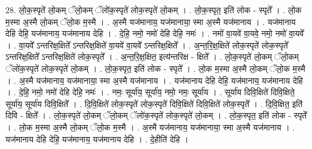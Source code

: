 \documentclass[17pt]{extarticle}
\begin{document}
28. लो॒क॒स्पृते॑ लो॒कम् ॅलो॒कम् ॅलो॑क॒स्पृते॑ लोक॒स्पृते॑ लो॒कम् । . लो॒क॒स्पृत॒ इति॑ लोक - स्पृते᳚ । . लो॒क म॒स्मा अ॒स्मै लो॒कम् ॅलो॒क म॒स्मै । . अ॒स्मै यज॑मानाय॒ यज॑मानाया॒ स्मा अ॒स्मै यज॑मानाय । . यज॑मानाय देहि देहि॒ यज॑मानाय॒ यज॑मानाय देहि । . दे॒हि॒ नमो॒ नमो॑ देहि देहि॒ नमः॑ । . नमो॑ वा॒यवे॑ वा॒यवे॒ नमो॒ नमो॑ वा॒यवे᳚ । . वा॒यवे᳚ ऽन्तरिक्ष॒क्षिते᳚ ऽन्तरिक्ष॒क्षिते॑ वा॒यवे॑ वा॒यवे᳚ ऽन्तरिक्ष॒क्षिते᳚ । . अ॒न्त॒रि॒क्ष॒क्षिते॑ लोक॒स्पृते॑ लोक॒स्पृते᳚ ऽन्तरिक्ष॒क्षिते᳚ ऽन्तरिक्ष॒क्षिते॑ लोक॒स्पृते᳚ । . अ॒न्त॒रि॒क्ष॒क्षित॒ इत्य॑न्तरिक्ष - क्षिते᳚ । . लो॒क॒स्पृते॑ लो॒कम् ॅलो॒कम् ॅलो॑क॒स्पृते॑ लोक॒स्पृते॑ लो॒कम् । . लो॒क॒स्पृत॒ इति॑ लोक - स्पृते᳚ । . लो॒क म॒स्मा अ॒स्मै लो॒कम् ॅलो॒क म॒स्मै । . अ॒स्मै यज॑मानाय॒ यज॑मानाया॒ स्मा अ॒स्मै यज॑मानाय । . यज॑मानाय देहि देहि॒ यज॑मानाय॒ यज॑मानाय देहि । . दे॒हि॒ नमो॒ नमो॑ देहि देहि॒ नमः॑ । . नमः॒ सूर्या॑य॒ सूर्या॑य॒ नमो॒ नमः॒ सूर्या॑य । . सूर्या॑य दिवि॒क्षिते॑ दिवि॒क्षिते॒ सूर्या॑य॒ सूर्या॑य दिवि॒क्षिते᳚ । . दि॒वि॒क्षिते॑ लोक॒स्पृते॑ लोक॒स्पृते॑ दिवि॒क्षिते॑ दिवि॒क्षिते॑ लोक॒स्पृते᳚ । . दि॒वि॒क्षित॒ इति॑ दिवि - क्षिते᳚ । . लो॒क॒स्पृते॑ लो॒कम् ॅलो॒कम् ॅलो॑क॒स्पृते॑ लोक॒स्पृते॑ लो॒कम् । . लो॒क॒स्पृत॒ इति॑ लोक - स्पृते᳚ । . लो॒क म॒स्मा अ॒स्मै लो॒कम् ॅलो॒क म॒स्मै । . अ॒स्मै यज॑मानाय॒ यज॑मानाया॒ स्मा अ॒स्मै यज॑मानाय । . यज॑मानाय देहि देहि॒ यज॑मानाय॒ यज॑मानाय देहि । . दे॒हीति॑ देहि । \newline
\end{document}
